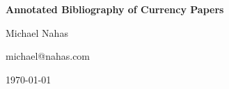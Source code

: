 \documentclass[12pt]{article}
\begin{document}
\begin{center}
   {\Large\textbf{Annotated Bibliography of Currency Papers}}
\medskip

   {\large   Michael Nahas
\medskip

	michael@nahas.com
\medskip

           \today
   }
\end{center}
\nocite{*}



\end{document}
